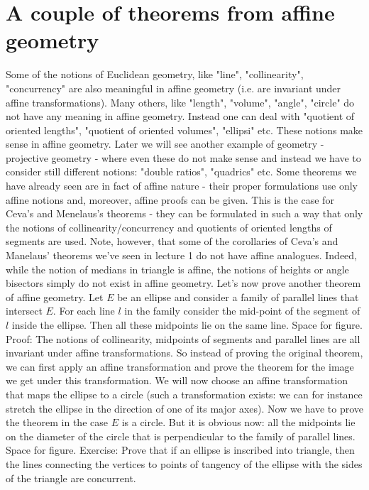 \section{A couple of theorems from affine geometry}
Some of the notions of Euclidean geometry, like "line", "collinearity", "concurrency" are also meaningful in affine geometry (i.e. are invariant under affine transformations). Many others, like "length", "volume", "angle", "circle" do not have any meaning in affine geometry. Instead one can deal with "quotient of oriented lengths", "quotient of oriented volumes", "ellipsi" etc. These notions make sense in affine geometry. Later we will see another example of geometry - projective geometry - where even these do not make sense and instead we have to consider still different notions: "double ratios", "quadrics" etc.
Some theorems we have already seen are in fact of affine nature - their proper formulations use only affine notions and, moreover, affine proofs can be given. This is the case for Ceva's and Menelaus's theorems - they can be formulated in such a way that only the notions of collinearity/concurrency and quotients of oriented lengths of segments are used.
Note, however, that some of the corollaries of Ceva's and Manelaus' theorems we've seen in lecture 1 do not have affine analogues. Indeed, while the notion of medians in triangle is affine, the notions of heights or angle bisectors simply do not exist in affine geometry.
Let's now prove another theorem of affine geometry. Let $E$ be an ellipse and consider a family of parallel lines that intersect $E$. For each line $l$ in the family consider the mid-point of the segment of $l$ inside the ellipse. Then all these midpoints lie on the same line.
Space for figure.
Proof: The notions of collinearity, midpoints of segments and parallel lines are all invariant under affine transformations. So instead of proving the original theorem, we can first apply an affine transformation and prove the theorem for the image we get under this transformation. We will now choose an affine transformation that maps the ellipse to a circle (such a transformation exists: we can for instance stretch the ellipse in the direction of one of its major axes).
Now we have to prove the theorem in the case $E$ is a circle. But it is obvious now: all the midpoints lie on the diameter of the circle that is perpendicular to the family of parallel lines.
Space for figure.
Exercise: Prove that if an ellipse is inscribed into triangle, then the lines connecting the vertices to points of tangency of the ellipse with the sides of the triangle are concurrent.
